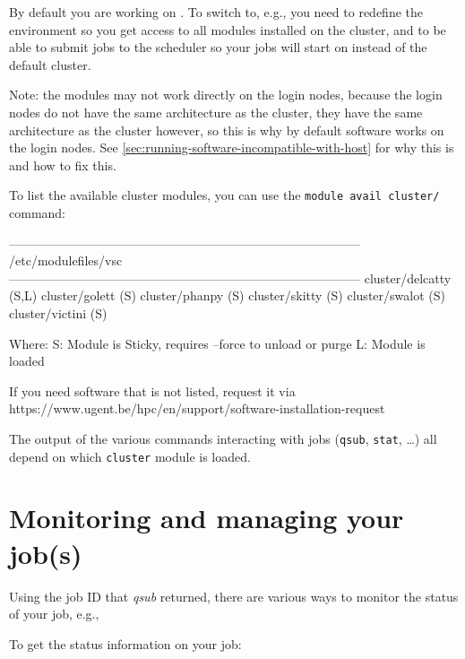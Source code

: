 By default you are working on . To switch to, e.g., \othercluster you need
to redefine the environment so you get access to all modules installed on
the \othercluster cluster, and to be able to submit jobs to the \othercluster scheduler
so your jobs will start on \othercluster instead of the default  cluster.

\begin{prompt}
\end{prompt}

Note: the \othercluster modules may not work directly on the login nodes, because the
login nodes do not have the same architecture as the \othercluster cluster, they
have the same architecture as the  cluster however, so this is why
by default software works on the login nodes. See \autoref{sec:running-software-incompatible-with-host}
for why this is and how to fix this.

To list the available cluster modules, you can use the \verb|module avail cluster/| command:
\begin{prompt}
------------------------------------------------------------------------------------ /etc/modulefiles/vsc ------------------------------------------------------------------------------------
   cluster/delcatty (S,L)    cluster/golett (S)    cluster/phanpy (S)    cluster/skitty (S)    cluster/swalot (S)    cluster/victini (S)

  Where:
   S:  Module is Sticky, requires --force to unload or purge
   L:  Module is loaded

If you need software that is not listed, request it via https://www.ugent.be/hpc/en/support/software-installation-request
\end{prompt}

The output of the various commands interacting with jobs (\verb|qsub|, \verb|stat|, \ldots)
all depend on which \verb|cluster| module is loaded.
\fi


\section{Monitoring and managing your job(s)}

Using the job ID that \textit{qsub} returned, there are various ways to monitor
the status of your job, e.g.,

To get the status information on your job:

\begin{prompt}
\end{prompt}

